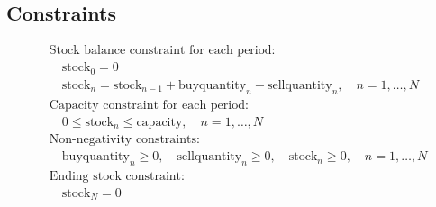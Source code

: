 \documentclass{article}
\begin{document}
\subsection*{Constraints}
\begin{align*}
    & \text{Stock balance constraint for each period:} \\
    & \quad \text{stock}_0 = 0 \\
    & \quad \text{stock}_n = \text{stock}_{n-1} + \text{buyquantity}_n - \text{sellquantity}_n, \quad n = 1, \ldots, N \\
    & \text{Capacity constraint for each period:} \\
    & \quad 0 \leq \text{stock}_n \leq \text{capacity}, \quad n = 1, \ldots, N \\
    & \text{Non-negativity constraints:} \\
    & \quad \text{buyquantity}_n \geq 0, \quad \text{sellquantity}_n \geq 0, \quad \text{stock}_n \geq 0, \quad n = 1, \ldots, N \\
    & \text{Ending stock constraint:} \\
    & \quad \text{stock}_N = 0
\end{align*}
\end{document}
